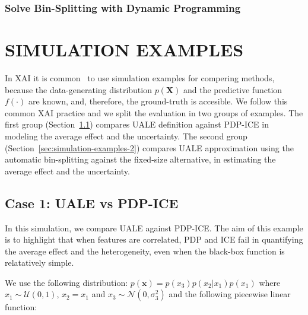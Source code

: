 \documentclass[twoside]{article}
\begin{document}
\subsubsection{Solve Bin-Splitting with Dynamic Programming}
\label{sec:dynamic-programing}


\section{SIMULATION EXAMPLES}
\label{sec:simulation-examples}

In XAI it is common~\citep{aas2021explaining, herbinger2022repid} to
use simulation examples for compering methods, because the
data-generating distribution \(p(\mathbf{X})\) and the predictive
function \(f(\cdot)\) are known, and, therefore, the ground-truth is
accesible. We follow this common XAI practice and we split the
evaluation in two groups of examples. The first group
(Section~\ref{sec:simulation-examples-1}) compares UALE definition
against PDP-ICE in modeling the average effect and the
uncertainty. The second group
(Section~\ref{sec:simulation-examples-2}) compares UALE approximation
using the automatic bin-splitting against the fixed-size alternative,
in estimating the average effect and the uncertainty. 

\subsection{Case 1: UALE vs PDP-ICE}
\label{sec:simulation-examples-1}

In this simulation, we compare UALE against PDP-ICE. The aim of this
example is to highlight that when features are correlated, PDP and ICE
fail in quantifying the average effect and the heterogeneity, even
when the black-box function is relatatively simple.

We use the following distribution:
\(p(\mathbf{x}) = p(x_3)p(x_2|x_1)p(x_1)\) where
\(x_1 \sim \mathcal{U}(0,1)\), \(x_2 = x_1\) and
\(x_3 \sim \mathcal{N}(0, \sigma_3^2)\) and the following piecewise
linear function:
\end{document}
